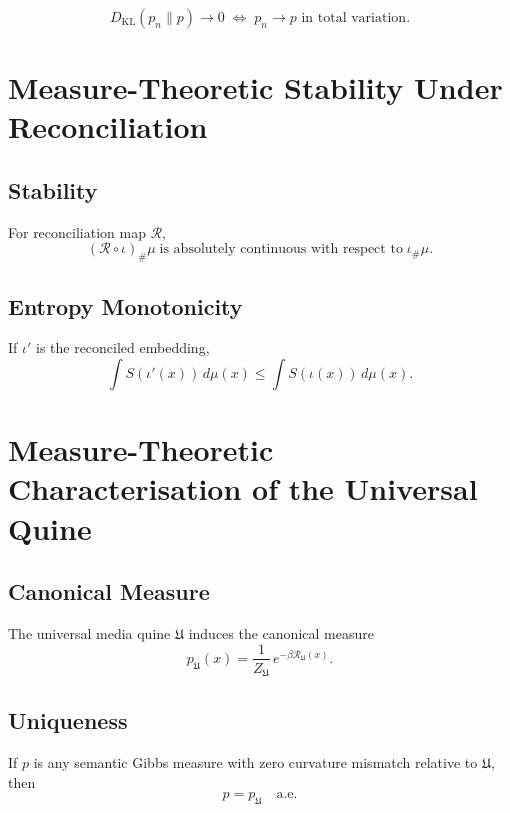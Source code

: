 \[
D_{\mathrm{KL}}(p_n\|p) \to 0
  \;\Longleftrightarrow\;
p_n \to p \text{ in total variation}.
\]

\section{Measure-Theoretic Stability Under Reconciliation}

\subsection{Stability}

For reconciliation map $\mathcal{R}$,
\[
(\mathcal{R}\circ\iota)_\#\mu
  \;\text{is absolutely continuous with respect to}\;
\iota_\#\mu.
\]

\subsection{Entropy Monotonicity}

If $\iota'$ is the reconciled embedding,
\[
\int S(\iota'(x))\, d\mu(x)
  \le
  \int S(\iota(x))\, d\mu(x).
\]

\section{Measure-Theoretic Characterisation of the Universal Quine}

\subsection{Canonical Measure}

The universal media quine $\mathfrak{U}$ induces the canonical measure
\[
p_{\mathfrak{U}}(x) = \frac{1}{Z_\mathfrak{U}}\, e^{-\beta \mathcal{R}_\mathfrak{U}(x)}.
\]

\subsection{Uniqueness}

If $p$ is any semantic Gibbs measure with zero curvature mismatch relative to $\mathfrak{U}$, then
\[
p = p_{\mathfrak{U}}
\quad\text{a.e.}
\]


